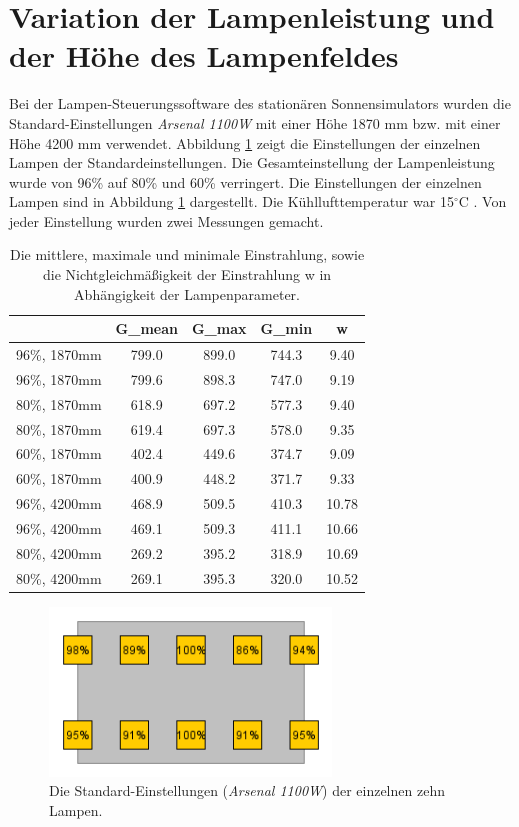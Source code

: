 \documentclass[a4paper,bibtotoc,oneside]{scrbook}
\begin{document}
\FloatBarrier

\section{Variation der Lampenleistung und der Höhe des Lampenfeldes}

Bei der Lampen-Steuerungssoftware des stationären Sonnensimulators wurden die Standard-Einstellungen \textit{Arsenal 1100W} mit einer Höhe 1870 mm bzw. mit einer Höhe 4200 mm verwendet. Abbildung \ref{std} zeigt die Einstellungen der einzelnen Lampen der Standardeinstellungen. Die Gesamteinstellung der Lampenleistung wurde von 96\% auf 80\% und 60\% verringert. Die Einstellungen der einzelnen Lampen sind in Abbildung \ref{std} dargestellt. Die Kühllufttemperatur war 15$^{\circ}$C . Von jeder Einstellung wurden zwei Messungen gemacht.

\begin{table}[htbp]
\centering
\begin{tabular}{ | c | c | c | c | c | }\hline
{\bf} & {\bf G\_{mean}} & {\bf G\_{max}} & {\bf G\_{min}} & {\bf w}\\ \hline
\hline
96\%, 1870mm & 799.0 & 899.0 & 744.3 & 9.40\\ \hline
96\%, 1870mm & 799.6 & 898.3 & 747.0 & 9.19\\ \hline
80\%, 1870mm & 618.9 & 697.2 & 577.3 & 9.40\\ \hline
80\%, 1870mm & 619.4 & 697.3 & 578.0 & 9.35\\ \hline
60\%, 1870mm & 402.4 & 449.6 & 374.7 & 9.09\\ \hline
60\%, 1870mm & 400.9 & 448.2 & 371.7 & 9.33\\ \hline
96\%, 4200mm & 468.9 & 509.5 & 410.3 & 10.78\\ \hline
96\%, 4200mm & 469.1 & 509.3 & 411.1 & 10.66\\ \hline
80\%, 4200mm & 269.2 & 395.2 & 318.9 & 10.69\\ \hline
80\%, 4200mm & 269.1 & 395.3 & 320.0 & 10.52\\ \hline
\end{tabular}
\caption{Die mittlere, maximale und minimale Einstrahlung, sowie die Nichtgleichmäßigkeit der Einstrahlung w in Abhängigkeit der Lampenparameter.}\label{TabG}
\end{table}

\begin{figure}[htbp]
\centering
\includegraphics[width=75mm]{img/std.png}
\caption{Die Standard-Einstellungen (\textit{Arsenal 1100W}) der einzelnen zehn Lampen.}\label{std}
\end{figure}
\end{document}
